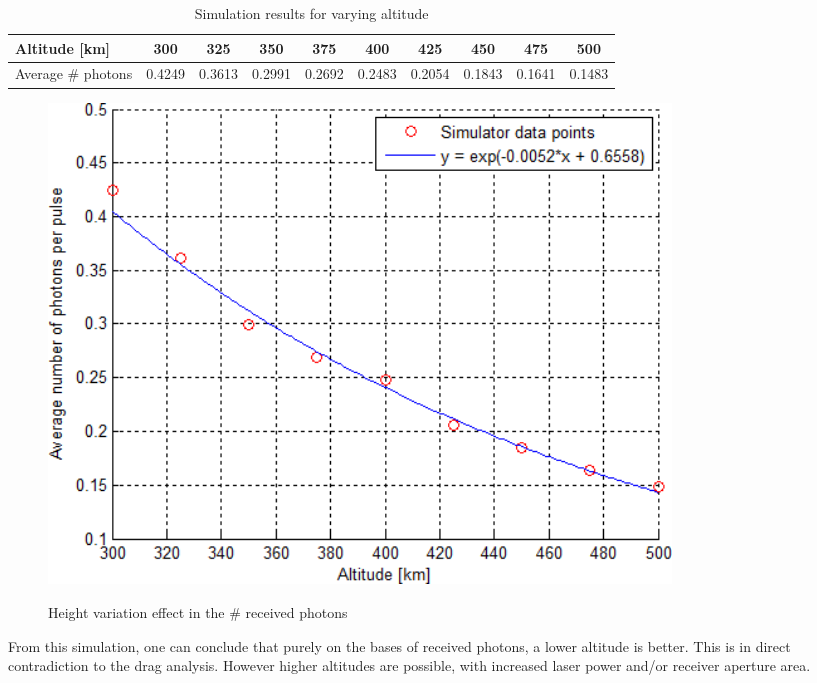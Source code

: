 \small
\begin{table}[ht!]
\begin{tabular}{| l | c | c | c | c | c | c | c |c | c |}
	\hline
		Altitude [km] &        300 &     325 &      350 &      375 &     400 &     425 &     450 &     475 &      500 \\
	\hline
		Average \# photons &  0.4249 &  0.3613 &   0.2991 &   0.2692 &  0.2483 &  0.2054 &  0.1843 &  0.1641 &   0.1483 \\
	\hline
\end{tabular}
\caption{Simulation results for varying altitude}
\label{table:simulationHeight}
\end{table} 

\begin{figure}[ht!]
	\centering
		\includegraphics[width=0.8\textwidth]{chapters/img/simulationHeight.png}
	\label{fig:simulationHeight}
	\caption{Height variation effect in the \# received photons}
\end{figure}

From this simulation, one can conclude that purely on the bases of received photons, a lower altitude is better. This is in direct contradiction to the drag analysis. However higher altitudes are possible, with increased \ac{laser} power and/or receiver aperture area.